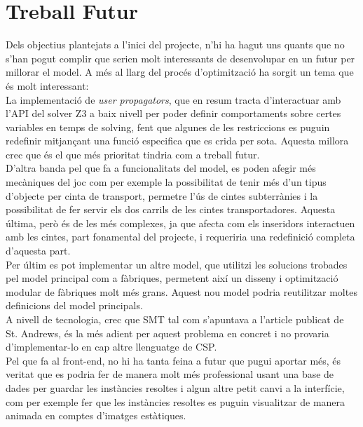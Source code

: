 


\chapter{Treball Futur} %

\label{Treball Futur} %
Dels objectius plantejats a l'inici del projecte, n'hi ha hagut uns quants que no s'han pogut complir que serien molt interessants de desenvolupar en un futur per millorar el model. A més al llarg del procés d'optimització ha sorgit un tema que és molt interessant:\\

La implementació de \textit{user propagators}, que en resum tracta d'interactuar amb l'API del solver Z3 a baix nivell per poder definir comportaments sobre certes variables en temps de solving, fent que algunes de les restriccions es puguin redefinir mitjançant una funció especifica que es crida per sota. Aquesta millora crec que és el que més prioritat tindria com a treball futur.\\

D'altra banda pel que fa a funcionalitats del model, es poden afegir més mecàniques del joc com per exemple la possibilitat de tenir més d'un tipus d'objecte per cinta de transport, permetre l'ús de cintes subterrànies i la possibilitat de fer servir els dos carrils de les cintes transportadores. Aquesta última, però és de les més complexes, ja que afecta com els inseridors interactuen amb les cintes, part fonamental del projecte, i requeriria una redefinició completa d'aquesta part.\\

Per últim es pot implementar un altre model, que utilitzi les solucions trobades pel model principal com a fàbriques, permetent així un disseny i optimització modular de fàbriques molt més grans. Aquest nou model podria reutilitzar moltes definicions del model principals.\\

A nivell de tecnologia, crec que SMT tal com s'apuntava a l'article publicat de St. Andrews, és la més adient per aquest problema en concret i no provaria d'implementar-lo en cap altre llenguatge de CSP.\\

Pel que fa al front-end, no hi ha tanta feina a futur que pugui aportar més, és veritat que es podria fer de manera molt més professional usant una base de dades per guardar les instàncies resoltes i algun altre petit canvi a la interfície, com per exemple fer que les instàncies resoltes es puguin visualitzar de manera animada en comptes d'imatges estàtiques.

